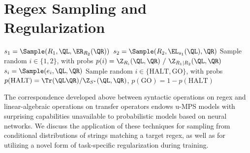\section{Regex Sampling and Regularization}
\label{sec:sampling}
%
\begin{algorithm}[tb]
\caption{Regex sampling algorithm for u-MPS}
\label{alg:sampling}
\begin{algorithmic}
   \hspace{4.0em} 
    \State{}
   \hspace{0.0em} 
    \State $s_1 = \Sample(R_1, \QL, \ER_{R_2}(\QR))$
    \State $s_2 = \Sample(R_2, \EL_{s_1}(\QL), \QR)$
    \State{}
   \hspace{-0.2em} 
    \State Sample random $i \in \{1, 2\}$, with probs 
    \State \hspace{0.7cm} $p(i) = \Z_{R_i}(\QL, \QR) \ / \ \Z_{R_1 | R_2}(\QL, \QR)$
    \State $s_i = \Sample(e_i, \QL, \QR)$
    \State{}
   \hspace{1.0em} 
    \State Sample random $i \in \{\textrm{HALT}, \textrm{GO}\}$, with probs 
    \State \hspace{0.7cm} $p(\textrm{HALT}) = \Tr(\QL \QR) / \Z_{S^*}(\QL, \QR)$, 
    \State \hspace{0.7cm} $p(\textrm{GO}) = 1 - p(\textrm{HALT})$
     \hspace{0.0em} 
      \State\Return{$\varepsilon$}
    \Else \hspace{6.0em} 
      \State{}
    \EndIf
  \EndIf
\EndFunction
\end{algorithmic}
\end{algorithm}
%
The correspondence developed above between syntactic operations on regex and linear-algebraic operations on transfer operators endows u-MPS models with surprising capabilities unavailable to probabilistic models based on neural networks. We discuss the application of these techniques for sampling from conditional distributions of strings matching a target regex, as well as for utilizing a novel form of task-specific regularization during training.

